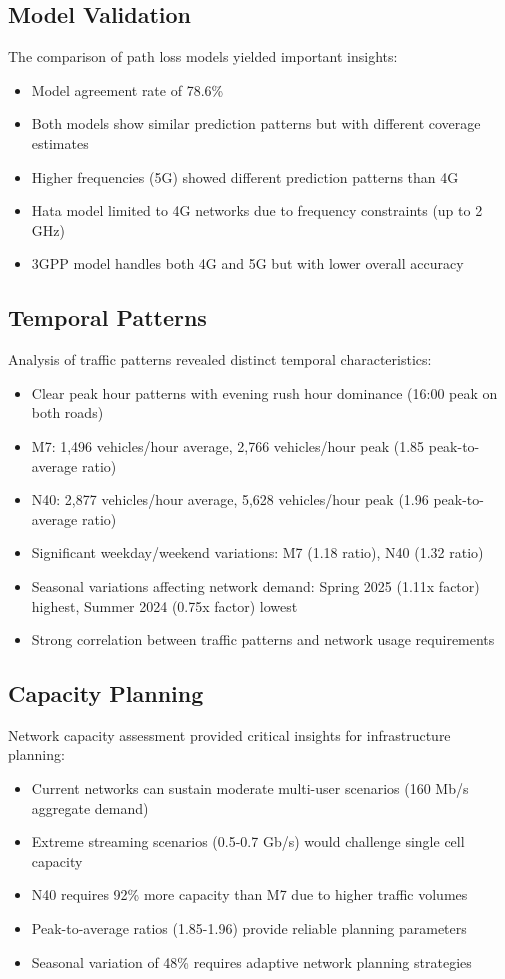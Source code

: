 \documentclass[MScCS]{uccthesis}
\begin{document}
\subsection{Model Validation}
The comparison of path loss models yielded important insights:
\begin{itemize}
\item Model agreement rate of 78.6\%
\item Both models show similar prediction patterns but with different coverage estimates
\item Higher frequencies (5G) showed different prediction patterns than 4G
\item Hata model limited to 4G networks due to frequency constraints (up to 2 GHz)
\item 3GPP model handles both 4G and 5G but with lower overall accuracy
\end{itemize}

\subsection{Temporal Patterns}
Analysis of traffic patterns revealed distinct temporal characteristics:
\begin{itemize}
\item Clear peak hour patterns with evening rush hour dominance (16:00 peak on both roads)
\item M7: 1,496 vehicles/hour average, 2,766 vehicles/hour peak (1.85 peak-to-average ratio)
\item N40: 2,877 vehicles/hour average, 5,628 vehicles/hour peak (1.96 peak-to-average ratio)
\item Significant weekday/weekend variations: M7 (1.18 ratio), N40 (1.32 ratio)
\item Seasonal variations affecting network demand: Spring 2025 (1.11x factor) highest, Summer 2024 (0.75x factor) lowest
\item Strong correlation between traffic patterns and network usage requirements
\end{itemize}

\subsection{Capacity Planning}
Network capacity assessment provided critical insights for infrastructure planning:
\begin{itemize}
\item Current networks can sustain moderate multi-user scenarios (160 Mb/s aggregate demand)
\item Extreme streaming scenarios (0.5-0.7 Gb/s) would challenge single cell capacity
\item N40 requires 92\% more capacity than M7 due to higher traffic volumes
\item Peak-to-average ratios (1.85-1.96) provide reliable planning parameters
\item Seasonal variation of 48\% requires adaptive network planning strategies
\end{itemize}
\end{document}
